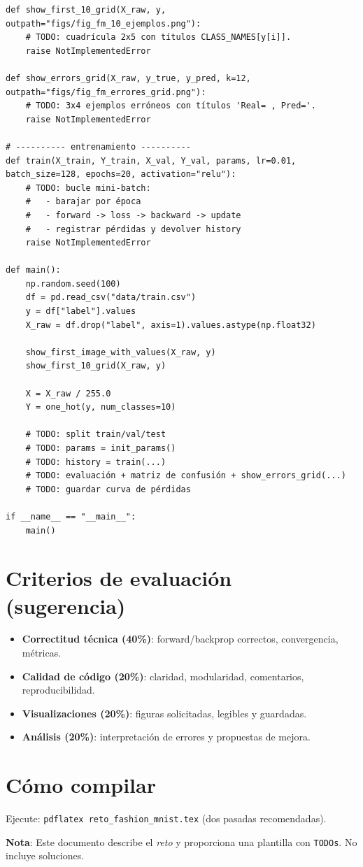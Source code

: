 \documentclass[12pt,a4paper]{article}
\begin{document}
\begin{lstlisting}[style=mypy,caption={Esqueleto de src/reto_fashion.py con TODOs}]
def show_first_10_grid(X_raw, y, outpath="figs/fig_fm_10_ejemplos.png"):
    # TODO: cuadrícula 2x5 con títulos CLASS_NAMES[y[i]].
    raise NotImplementedError

def show_errors_grid(X_raw, y_true, y_pred, k=12, outpath="figs/fig_fm_errores_grid.png"):
    # TODO: 3x4 ejemplos erróneos con títulos 'Real= , Pred='.
    raise NotImplementedError

# ---------- entrenamiento ----------
def train(X_train, Y_train, X_val, Y_val, params, lr=0.01, batch_size=128, epochs=20, activation="relu"):
    # TODO: bucle mini-batch:
    #   - barajar por época
    #   - forward -> loss -> backward -> update
    #   - registrar pérdidas y devolver history
    raise NotImplementedError

def main():
    np.random.seed(100)
    df = pd.read_csv("data/train.csv")
    y = df["label"].values
    X_raw = df.drop("label", axis=1).values.astype(np.float32)

    show_first_image_with_values(X_raw, y)
    show_first_10_grid(X_raw, y)

    X = X_raw / 255.0
    Y = one_hot(y, num_classes=10)

    # TODO: split train/val/test
    # TODO: params = init_params()
    # TODO: history = train(...)
    # TODO: evaluación + matriz de confusión + show_errors_grid(...)
    # TODO: guardar curva de pérdidas

if __name__ == "__main__":
    main()
\end{lstlisting}

\section*{Criterios de evaluación (sugerencia)}
\begin{itemize}[leftmargin=*,nosep]
  \item \textbf{Correctitud técnica (40\%)}: forward/backprop correctos, convergencia, métricas.
  \item \textbf{Calidad de código (20\%)}: claridad, modularidad, comentarios, reproducibilidad.
  \item \textbf{Visualizaciones (20\%)}: figuras solicitadas, legibles y guardadas.
  \item \textbf{Análisis (20\%)}: interpretación de errores y propuestas de mejora.
\end{itemize}

\section*{Cómo compilar}
Ejecute: \texttt{pdflatex reto\_fashion\_mnist.tex} (dos pasadas recomendadas).

\bigskip
\noindent\textbf{Nota}: Este documento describe el \emph{reto} y proporciona una plantilla con \texttt{TODOs}. No incluye soluciones.
\end{document}
